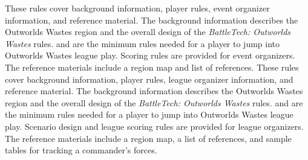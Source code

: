  {
These rules cover background information, player rules, event organizer information, and reference material.
The background information describes the Outworlds Wastes region and the overall design of the \emph{BattleTech: Outworlds Wastes} rules.
 and  are the minimum rules needed for a player to jump into Outworlds Wastes league play.
Scoring rules are provided for event organizers.
The reference materials include a region map and list of references.
} {
These rules cover background information, player rules, league organizer information, and reference material.
The background information describes the Outworlds Wastes region and the overall design of the \emph{BattleTech: Outworlds Wastes} rules.
 and  are the minimum rules needed for a player to jump into Outworlds Wastes league play.
Scenario design and league scoring rules are provided for league organizers.
The reference materials include a region map, a list of references, and sample tables for tracking a commander's forces.
}
